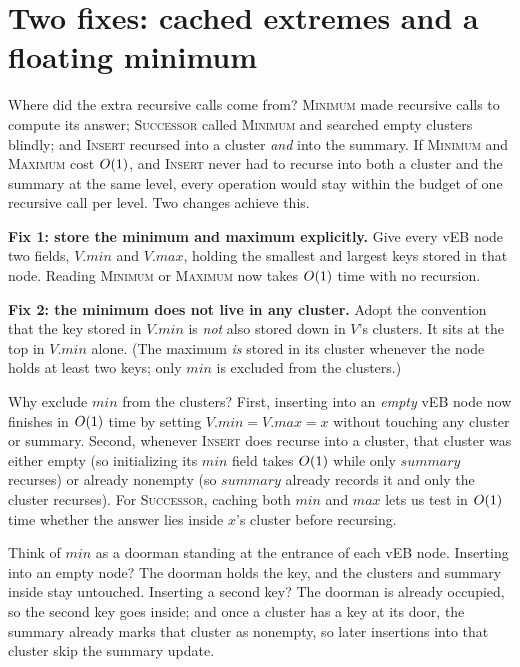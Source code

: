 \section{Two fixes: cached extremes and a floating minimum}

Where did the extra recursive calls come from? \textsc{Minimum} made recursive
calls to compute its answer; \textsc{Successor} called \textsc{Minimum} and searched empty clusters blindly; and
\textsc{Insert} recursed into a cluster \emph{and} into the
summary. If \textsc{Minimum} and \textsc{Maximum} cost $O(1)$, and
\textsc{Insert} never had to recurse into both a cluster and the summary at the same level, every operation would stay within the budget of one recursive call per level. Two
changes achieve this.

\textbf{Fix 1: store the minimum and maximum explicitly.} Give every vEB node two
fields, $V.\mathit{min}$ and $V.\mathit{max}$, holding the smallest and
largest keys stored in that node. Reading \textsc{Minimum} or \textsc{Maximum} now takes
$O(1)$ time with no recursion.

\textbf{Fix 2: the minimum does not live in any cluster.} Adopt the convention that the key stored in
$V.\mathit{min}$ is \emph{not} also stored down in $V$'s clusters. It sits at the
top in $V.\mathit{min}$ alone. (The maximum \emph{is} stored in
its cluster whenever the node holds at least two keys; only $\mathit{min}$ is excluded from the clusters.)

Why exclude $\mathit{min}$ from the clusters? First, inserting into an \emph{empty} vEB node now finishes in $O(1)$ time by setting $V.\mathit{min} = V.\mathit{max} = x$ without touching any cluster or summary. Second, whenever
\textsc{Insert} does recurse into a cluster, that cluster was either empty (so initializing its $\mathit{min}$ field takes $O(1)$ while only $\mathit{summary}$ recurses) or already nonempty (so $\mathit{summary}$ already records it and only the cluster recurses). For \textsc{Successor}, caching both $\mathit{min}$ and $\mathit{max}$ lets us test in $O(1)$ time whether the answer lies inside $x$'s cluster before recursing.

\begin{intuitionbox}
Think of $\mathit{min}$ as a doorman standing at the entrance of each vEB node.
Inserting into an empty node? The doorman holds the key, and the clusters and summary inside stay untouched.
Inserting a second key? The doorman is already occupied, so the second key goes inside; and once a cluster has a key at its door, the summary already marks that cluster as nonempty, so later insertions into that cluster skip the summary update.
\end{intuitionbox}

